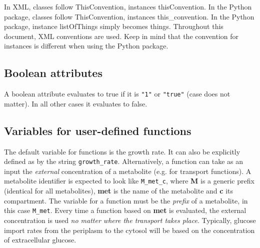 \documentclass[12pt]{scrartcl}
\begin{document}
In XML, classes follow ThisConvention, instances thisConvention.
In the Python package, classes follow ThisConvention, instances this\_convention.
In the Python package, instance listOfThings simply becomes things.
Throughout this document, XML conventions are used.
Keep in mind that the convention for instances is different when using the
Python package.

\subsection{Boolean attributes}

A boolean attribute evaluates to true if it is \texttt{"1"}
or \texttt{"true"} (case does not matter).
In all other cases it evaluates to false.

\subsection{Variables for user-defined functions}

The default variable for functions is the growth rate.
It can also be explicitly defined as by the string \texttt{growth\_rate}.
Alternatively, a function can take as an input the \emph{external}
concentration of a metabolite (e.g. for transport functions).
A metabolite identifier is expected to look like \texttt{M\_met\_c},
where \textbf{M} is a generic prefix (identical for all metabolites),
\textbf{met} is the name of the metabolite
and \textbf{c} its compartment.
The variable for a function must be the
\emph{prefix} of a metabolite, in this case \texttt{M\_met}.
Every time a function based on \textbf{met} is evaluated,
the external concentration is used
\emph{no matter where the transport takes place}.
Typically, glucose import rates from the periplasm to the cytosol
will be based on the concentration of extracellular glucose.








\end{document}
